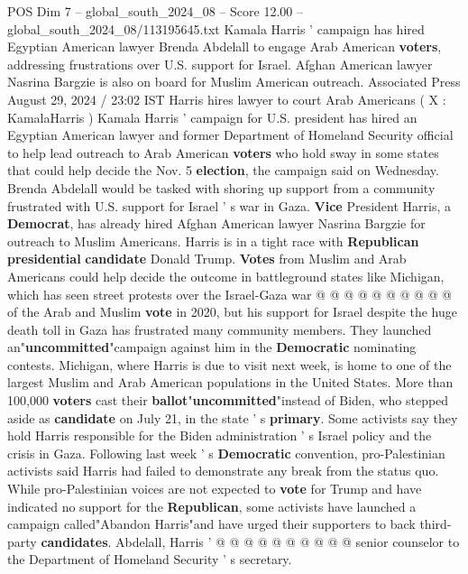 \begin{textsample}{POS Dim 7 – global\_south\_2024\_08 – Score 12.00 – global\_south\_2024\_08/113195645.txt}  \label{ex:f7_pos_181}
Kamala Harris ' campaign has hired Egyptian American lawyer Brenda Abdelall to engage Arab American \textbf{voters}, addressing frustrations over U.S. support for Israel.
Afghan American lawyer Nasrina Bargzie is also on board for Muslim American outreach.
Associated Press August 29, 2024 / 23:02 IST Harris hires lawyer to court Arab Americans ( X : KamalaHarris ) Kamala Harris ' campaign for U.S. president has hired an Egyptian American lawyer and former Department of Homeland Security official to help lead outreach to Arab American \textbf{voters} who hold sway in some states that could help decide the Nov. 5 \textbf{election}, the campaign said on Wednesday.
Brenda Abdelall would be tasked with shoring up support from a community frustrated with U.S. support for Israel ' s war in Gaza. \textbf{Vice} President Harris, a \textbf{Democrat}, has already hired Afghan American lawyer Nasrina Bargzie for outreach to Muslim Americans.
Harris is in a tight race with \textbf{Republican} \textbf{presidential} \textbf{candidate} Donald Trump. \textbf{Votes} from Muslim and Arab Americans could help decide the outcome in battleground states like Michigan, which has seen street protests over the Israel-Gaza war @ @ @ @ @ @ @ @ @ @ of the Arab and Muslim \textbf{vote} in 2020, but his support for Israel despite the huge death toll in Gaza has frustrated many community members.
They launched an"\textbf{uncommitted}"campaign against him in the \textbf{Democratic} nominating contests.
Michigan, where Harris is due to visit next week, is home to one of the largest Muslim and Arab American populations in the United States.
More than 100,000 \textbf{voters} cast their \textbf{ballot}"\textbf{uncommitted}"instead of Biden, who stepped aside as \textbf{candidate} on July 21, in the state ' s \textbf{primary}.
Some activists say they hold Harris responsible for the Biden administration ' s Israel policy and the crisis in Gaza.
Following last week ' s \textbf{Democratic} convention, pro-Palestinian activists said Harris had failed to demonstrate any break from the status quo.
While pro-Palestinian voices are not expected to \textbf{vote} for Trump and have indicated no support for the \textbf{Republican}, some activists have launched a campaign called"Abandon Harris"and have urged their supporters to back third-party \textbf{candidates}.
Abdelall, Harris ' @ @ @ @ @ @ @ @ @ @ senior counselor to the Department of Homeland Security ' s secretary.

\end{textsample}
